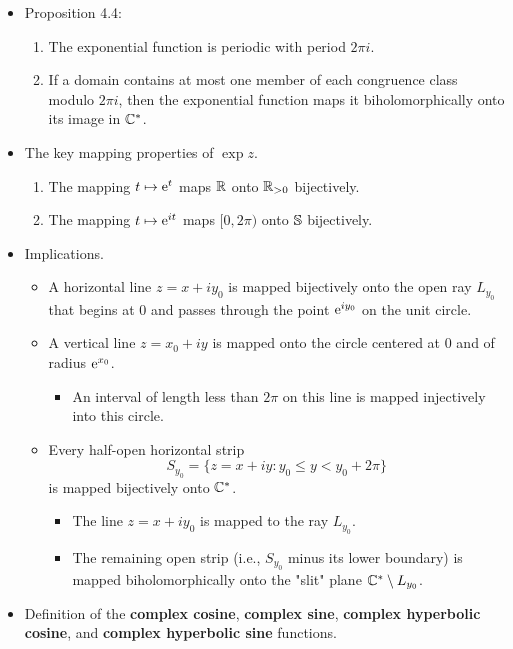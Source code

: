 \documentclass[../notes.tex]{subfiles}
\begin{document}
\begin{itemize}
    \item Proposition 4.4:
    \begin{enumerate}[label={\roman*.}]
        \item The exponential function is periodic with period $2\pi i$.
        \item If a domain contains at most one member of each congruence class modulo $2\pi i$, then the exponential function maps it biholomorphically onto its image in $\C^*$.
    \end{enumerate}
    \item The key mapping properties of $\exp z$.
    \begin{enumerate}
        \item The mapping $t\mapsto\e[t]$ maps $\R$ onto $\R_{>0}$ bijectively.
        \item The mapping $t\mapsto\e[it]$ maps $[0,2\pi)$ onto $\Ss$ bijectively.
    \end{enumerate}
    \item Implications.
    \begin{itemize}
        \item A horizontal line $z=x+iy_0$ is mapped bijectively onto the open ray $L_{y_0}$ that begins at 0 and passes through the point $\e[iy_0]$ on the unit circle.
        \item A vertical line $z=x_0+iy$ is mapped onto the circle centered at 0 and of radius $\e[x_0]$.
        \begin{itemize}
            \item An interval of length less than $2\pi$ on this line is mapped injectively into this circle.
        \end{itemize}
        \item Every half-open horizontal strip
        \begin{equation*}
            S_{y_0} = \{z=x+iy:y_0\leq y<y_0+2\pi\}
        \end{equation*}
        is mapped bijectively onto $\C^*$.
        \begin{itemize}
            \item The line $z=x+iy_0$ is mapped to the ray $L_{y_0}$.
            \item The remaining open strip (i.e., $S_{y_0}$ minus its lower boundary) is mapped biholomorphically onto the "slit" plane $\C^*\setminus L_{y_0}$.
        \end{itemize}
    \end{itemize}
    \item Definition of the \textbf{complex cosine}, \textbf{complex sine}, \textbf{complex hyperbolic cosine}, and \textbf{complex hyperbolic sine} functions.

\end{itemize}
\end{document}
